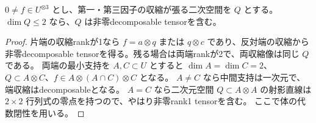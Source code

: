 \begin{lemma}[三次tensorの小さい両端収縮]
\label{lem:cubic-small-end-contractions}
$0\ne f\in U^{\otimes3}$ とし、第一・第三因子の収縮が張る二次空間を $Q$ とする。
$\dim Q\le2$ なら、$Q$ は非零decomposable tensorを含む。
\end{lemma}
\begin{proof}
片端の収縮rankが1なら $f=a\otimes q$ または $q\otimes c$ であり、反対端の収縮から
非零decomposable tensorを得る。残る場合は両端rankが2で、両収縮像は同じ $Q$ である。
両端の最小支持を $A,C\subset U$ とすると $\dim A=\dim C=2$、
$Q\subset A\otimes C$、$f\in A\otimes(A\cap C)\otimes C$ となる。
$A\ne C$ なら中間支持は一次元で、端収縮はdecomposableとなる。
$A=C$ なら二次元空間 $Q\subset A\otimes A$ の射影直線は
$2\times2$ 行列式の零点を持つので、やはり非零rank1 tensorを含む。
ここで体の代数閉性を用いる。
\end{proof}

